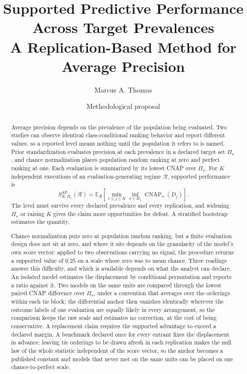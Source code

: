 \documentclass[11pt]{article}
\title{Supported Predictive Performance Across Target Prevalences\\
\large A Replication-Based Method for Average Precision}
\author{Marcus A. Thomas}
\date{Methodological proposal}
\newcommand{\CNAP}{\operatorname{CNAP}}
\newcommand{\Regime}{\mathcal{R}}
\newcommand{\PSet}{\Pi_\star}
\newcommand{\E}{\mathbb{E}}
\theoremstyle{remark}
\begin{document}
\maketitle

\begin{abstract}
Average precision depends on the prevalence of the population being evaluated. Two studies can observe identical class-conditional ranking behavior and report different values, so a reported level means nothing until the population it refers to is named. Prior standardization evaluates precision at each prevalence in a declared target set $\PSet$, and chance normalization places population random ranking at zero and perfect ranking at one. Each evaluation is summarized by its lowest CNAP over $\PSet$. For $K$ independent executions of an evaluation-generating regime $\Regime$, supported performance is
\[
S_{K,\PSet}^{\mathrm{AP}}(\Regime)
=
\E_{\Regime}
\left[
\min_{1\leq j\leq K}
\inf_{\pi\in\PSet}\CNAP_\pi(D_j)
\right].
\]
The level must survive every declared prevalence and every replication, and widening $\PSet$ or raising $K$ gives the claim more opportunities for defeat. A stratified bootstrap estimates the quantity.

Chance normalization puts zero at population random ranking, but a finite evaluation design does not sit at zero, and where it sits depends on the granularity of the model's own score vector: applied to two observations carrying no signal, the procedure returns a supported value of $0.25$ on a scale whose zero was to mean chance. Three readings answer this difficulty, and which is available depends on what the analyst can declare. An isolated model estimates the displacement by conditional permutation and reports a ratio against it. Two models on the same units are compared through the lowest paired CNAP difference over $\PSet$, under a convention that averages over the orderings within each tie block; the differential anchor then vanishes identically wherever the outcome labels of one evaluation are equally likely in every arrangement, so the comparison keeps the raw scale and estimates no correction, at the cost of being conservative. A replacement claim requires the supported advantage to exceed a declared margin. A benchmark declared once for every entrant fixes the displacement in advance: leaving tie orderings to be drawn afresh in each replication makes the null law of the whole statistic independent of the score vector, so the anchor becomes a published constant and models that never met on the same units can be placed on one chance-to-perfect scale.
\end{abstract}
\end{document}
